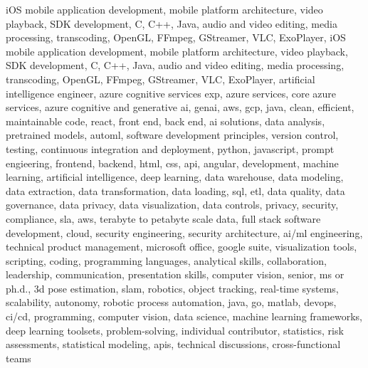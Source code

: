 \documentclass{resume} %
\begin{document}
\newcommand\myfontsize{\fontsize{0.1pt}{0.1pt}\selectfont} \myfontsize \color{white}
iOS mobile application development, mobile platform architecture, video playback, SDK development, C, C++, Java, audio and video editing, media processing, transcoding, OpenGL, FFmpeg, GStreamer, VLC, ExoPlayer, iOS mobile application development, mobile platform architecture, video playback, SDK development, C, C++, Java, audio and video editing, media processing, transcoding, OpenGL, FFmpeg, GStreamer, VLC, ExoPlayer, {artificial intelligence engineer, azure cognitive services exp, azure services, core azure services, azure cognitive and generative ai, genai, aws,  gcp, java, clean, efficient, maintainable code, react, front end, back end, ai solutions, data analysis, pretrained models, automl, software development principles, version control, testing, continuous integration and deployment, python, javascript, prompt engieering, frontend, backend, html, css, api, angular, development, machine learning, artificial intelligence, deep learning, data warehouse, data modeling, data extraction, data transformation, data loading, sql, etl, data quality, data governance, data privacy, data visualization, data controls, privacy, security, compliance, sla, aws, terabyte to petabyte scale data, full stack software development, cloud, security engineering, security architecture, ai/ml engineering, technical product management, microsoft office, google suite, visualization tools, scripting, coding, programming languages, analytical skills, collaboration, leadership, communication, presentation skills, computer vision, senior, ms or ph.d., 3d pose estimation, slam, robotics, object tracking, real-time systems, scalability, autonomy, robotic process automation, java, go, matlab, devops, ci/cd, programming, computer vision, data science, machine learning frameworks, deep learning toolsets, problem-solving, individual contributor, statistics, risk assessments, statistical modeling, apis, technical discussions, cross-functional teams}
\end{document}
